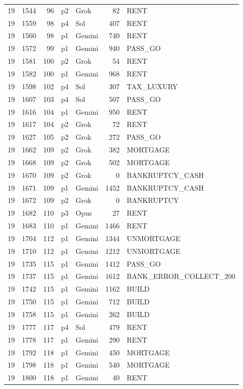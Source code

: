 \begin{longtable}{r r r l l r >{\ttfamily}l}
19 & 1544 & 96 & p2 & Grok & 82 & RENT \\
19 & 1559 & 98 & p4 & Sol & 407 & RENT \\
19 & 1560 & 98 & p1 & Gemini & 740 & RENT \\
19 & 1572 & 99 & p1 & Gemini & 940 & PASS\_GO \\
19 & 1581 & 100 & p2 & Grok & 54 & RENT \\
19 & 1582 & 100 & p1 & Gemini & 968 & RENT \\
19 & 1598 & 102 & p4 & Sol & 307 & TAX\_LUXURY \\
19 & 1607 & 103 & p4 & Sol & 507 & PASS\_GO \\
19 & 1616 & 104 & p1 & Gemini & 950 & RENT \\
19 & 1617 & 104 & p2 & Grok & 72 & RENT \\
19 & 1627 & 105 & p2 & Grok & 272 & PASS\_GO \\
19 & 1662 & 109 & p2 & Grok & 382 & MORTGAGE \\
19 & 1668 & 109 & p2 & Grok & 502 & MORTGAGE \\
19 & 1670 & 109 & p2 & Grok & 0 & BANKRUPTCY\_CASH \\
19 & 1671 & 109 & p1 & Gemini & 1452 & BANKRUPTCY\_CASH \\
19 & 1672 & 109 & p2 & Grok & 0 & BANKRUPTCY \\
19 & 1682 & 110 & p3 & Opus & 27 & RENT \\
19 & 1683 & 110 & p1 & Gemini & 1466 & RENT \\
19 & 1704 & 112 & p1 & Gemini & 1344 & UNMORTGAGE \\
19 & 1710 & 112 & p1 & Gemini & 1212 & UNMORTGAGE \\
19 & 1735 & 115 & p1 & Gemini & 1412 & PASS\_GO \\
19 & 1737 & 115 & p1 & Gemini & 1612 & BANK\_ERROR\_COLLECT\_200 \\
19 & 1742 & 115 & p1 & Gemini & 1162 & BUILD \\
19 & 1750 & 115 & p1 & Gemini & 712 & BUILD \\
19 & 1758 & 115 & p1 & Gemini & 262 & BUILD \\
19 & 1777 & 117 & p4 & Sol & 479 & RENT \\
19 & 1778 & 117 & p1 & Gemini & 290 & RENT \\
19 & 1792 & 118 & p1 & Gemini & 450 & MORTGAGE \\
19 & 1798 & 118 & p1 & Gemini & 540 & MORTGAGE \\
19 & 1800 & 118 & p1 & Gemini & 40 & RENT \\

\end{longtable}
